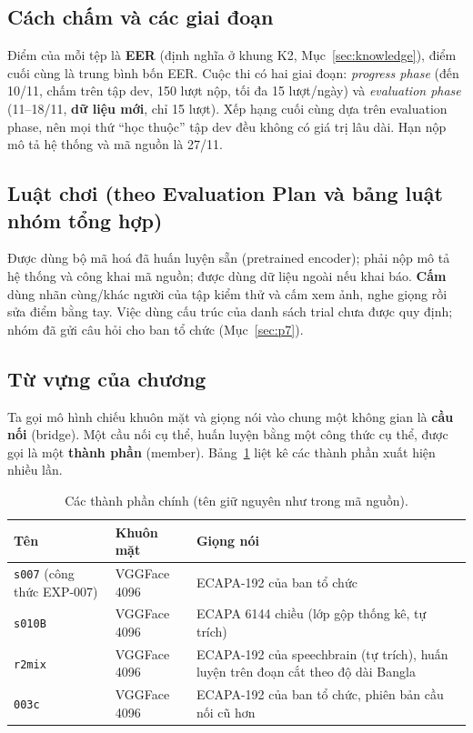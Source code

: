 \documentclass[11pt,a4paper,oneside]{report}
\newcommand{\key}[1]{\textbf{\color{accent}#1}}
\newcommand{\id}[1]{\texttt{#1}}
\begin{document}
\subsection{Cách chấm và các giai đoạn}
Điểm của mỗi tệp là \key{EER} (định nghĩa ở khung K2, Mục~\ref{sec:knowledge}), điểm cuối cùng là trung bình bốn EER. Cuộc thi có hai giai đoạn: \emph{progress phase} (đến 10/11, chấm trên tập dev, 150 lượt nộp, tối đa 15 lượt/ngày) và \emph{evaluation phase} (11--18/11, \textbf{dữ liệu mới}, chỉ 15 lượt). Xếp hạng cuối cùng dựa trên evaluation phase, nên mọi thứ ``học thuộc'' tập dev đều không có giá trị lâu dài. Hạn nộp mô tả hệ thống và mã nguồn là 27/11.

\subsection{Luật chơi (theo Evaluation Plan và bảng luật nhóm tổng hợp)}
Được dùng bộ mã hoá đã huấn luyện sẵn (pretrained encoder); phải nộp mô tả hệ thống và công khai mã nguồn; được dùng dữ liệu ngoài nếu khai báo. \textbf{Cấm} dùng nhãn cùng/khác người của tập kiểm thử và cấm xem ảnh, nghe giọng rồi sửa điểm bằng tay. Việc dùng cấu trúc của danh sách trial chưa được quy định; nhóm đã gửi câu hỏi cho ban tổ chức (Mục~\ref{sec:p7}).

\subsection{Từ vựng của chương}
Ta gọi mô hình chiếu khuôn mặt và giọng nói vào chung một không gian là \key{cầu nối} (bridge). Một cầu nối cụ thể, huấn luyện bằng một công thức cụ thể, được gọi là một \key{thành phần} (member). Bảng~\ref{tab:members} liệt kê các thành phần xuất hiện nhiều lần.

\begin{table}[h]
\centering\small
\caption{Các thành phần chính (tên giữ nguyên như trong mã nguồn).}
\label{tab:members}
\begin{tabular}{>{\raggedright}p{3.6cm}>{\raggedright}p{2.6cm}>{\raggedright\arraybackslash}p{8.2cm}}
\toprule
Tên & Khuôn mặt & Giọng nói \\
\midrule
\id{s007} (công thức EXP-007) & VGGFace 4096 & ECAPA-192 của ban tổ chức \\
\id{s010B} & VGGFace 4096 & ECAPA 6144 chiều (lớp gộp thống kê, tự trích) \\
\id{r2mix} & VGGFace 4096 & ECAPA-192 của speechbrain (tự trích), huấn luyện trên đoạn cắt theo độ dài Bangla \\
\id{003c} & VGGFace 4096 & ECAPA-192 của ban tổ chức, phiên bản cầu nối cũ hơn \\
\bottomrule
\end{tabular}
\end{table}
\end{document}
